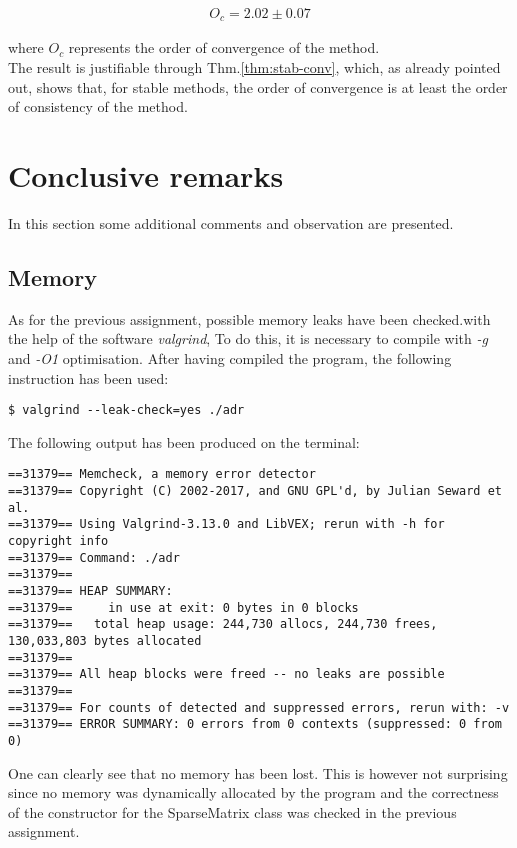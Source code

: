 \documentclass[11pt]{article}
\theoremstyle{theorem}
\theoremstyle{definition}
\begin{document}
\begin{align}
	\label{eqn:order-of-convergence}
	O_c = 2.02 \pm 0.07
\end{align} 

where $O_c$ represents the order of convergence of the method.\\
The result is justifiable through Thm.\ref{thm:stab-conv}, which, as already pointed out, shows that, for stable methods, the order of convergence is at least the order of consistency of the method.

\section{Conclusive remarks}
In this section some additional comments and observation are presented.

\subsection{Memory}
As for the previous assignment, possible memory leaks have been checked.with the help of the software \emph{valgrind}, To do this, it is necessary to compile with \emph{-g} and \emph{-O1} optimisation. After having compiled the program, the following instruction has been used:


\begin{lstlisting}
$ valgrind --leak-check=yes ./adr
\end{lstlisting}


The following output has been produced on the terminal:

\begin{verbatim}
==31379== Memcheck, a memory error detector
==31379== Copyright (C) 2002-2017, and GNU GPL'd, by Julian Seward et al.
==31379== Using Valgrind-3.13.0 and LibVEX; rerun with -h for copyright info
==31379== Command: ./adr
==31379==
==31379== HEAP SUMMARY:
==31379==     in use at exit: 0 bytes in 0 blocks
==31379==   total heap usage: 244,730 allocs, 244,730 frees, 130,033,803 bytes allocated
==31379==
==31379== All heap blocks were freed -- no leaks are possible
==31379==
==31379== For counts of detected and suppressed errors, rerun with: -v
==31379== ERROR SUMMARY: 0 errors from 0 contexts (suppressed: 0 from 0)
\end{verbatim}

One can clearly see that no memory has been lost. This is however not surprising since no memory was dynamically allocated by the program and the correctness of the constructor for the SparseMatrix class was checked in the previous assignment.\\
\end{document}
